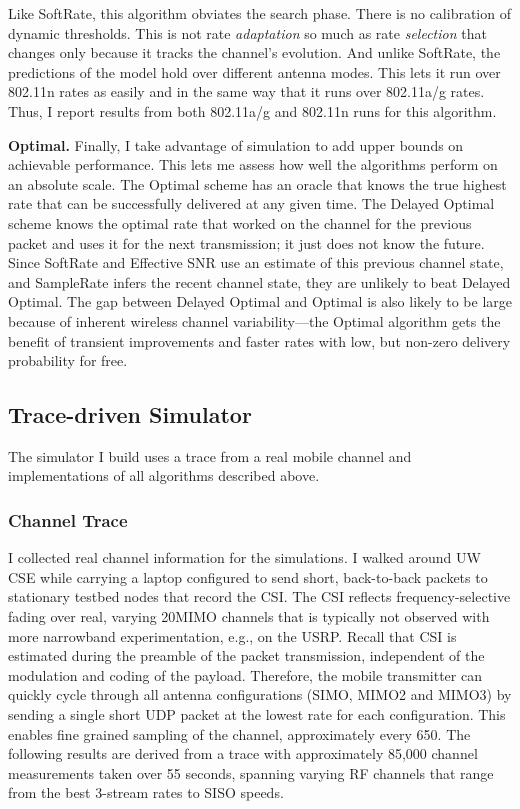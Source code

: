 Like SoftRate, this algorithm obviates the search phase. There is no calibration of dynamic thresholds. This is not rate \emph{adaptation} so much as rate \emph{selection} that changes only because it tracks the channel's evolution. And unlike SoftRate, the predictions of the model hold over different antenna modes. This lets it run over 802.11n rates as easily and in the same way that it runs over 802.11a/g rates. Thus, I report results from both 802.11a/g and 802.11n runs for this algorithm.

\textbf{Optimal.} Finally, I take advantage of simulation to add upper bounds on achievable performance. This lets me assess how well the algorithms perform on an absolute scale. The Optimal scheme has an oracle that knows the true highest rate that can be successfully delivered at any given time. The Delayed Optimal scheme knows the optimal rate that worked on the channel for the previous packet and uses it for the next transmission; it just does not know the future. Since SoftRate and Effective SNR use an estimate of this previous channel state, and SampleRate infers the recent channel state, they are unlikely to beat Delayed Optimal. The gap between Delayed Optimal and Optimal is also likely to be large because of inherent wireless channel variability---the Optimal algorithm gets the benefit of transient improvements and faster rates with low, but non-zero delivery probability for free.

\subsection{Trace-driven Simulator}

The simulator I build uses a trace from a real mobile channel and implementations of all algorithms described above.

\subsubsection{Channel Trace}
I collected real channel information for the simulations. I walked around UW CSE while carrying a laptop configured to send short, back-to-back packets to stationary testbed nodes that record the CSI. The CSI reflects frequency-selective fading over real, varying 20\MHz MIMO channels that is typically not observed with more narrowband experimentation, e.g., on the USRP. Recall that CSI is estimated during the preamble of the packet transmission, independent of the modulation and coding of the payload. Therefore, the mobile transmitter can quickly cycle through all antenna configurations (SIMO, MIMO2 and MIMO3) by sending a single short UDP packet at the lowest rate for each configuration. This enables fine grained sampling of the channel, approximately every 650\us. The following results are derived from a trace with approximately 85,000 channel measurements taken over 55 seconds, spanning varying RF channels that range from the best 3-stream rates to SISO speeds.

